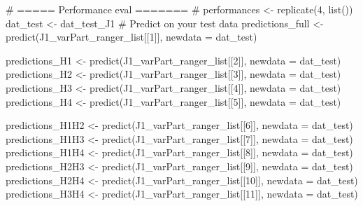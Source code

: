 \documentclass[
  letterpaper,
  DIV=11,
  numbers=noendperiod]{scrreprt}
\newenvironment{Shaded}{\begin{snugshade}}{\end{snugshade}}
\newcommand{\AttributeTok}[1]{\textcolor[rgb]{0.40,0.45,0.13}{#1}}
\newcommand{\CommentTok}[1]{\textcolor[rgb]{0.37,0.37,0.37}{#1}}
\newcommand{\DecValTok}[1]{\textcolor[rgb]{0.68,0.00,0.00}{#1}}
\newcommand{\FunctionTok}[1]{\textcolor[rgb]{0.28,0.35,0.67}{#1}}
\newcommand{\NormalTok}[1]{\textcolor[rgb]{0.00,0.23,0.31}{#1}}
\newcommand{\OtherTok}[1]{\textcolor[rgb]{0.00,0.23,0.31}{#1}}
\begin{document}
\begin{Shaded}
\begin{Highlighting}[]
\CommentTok{\# ===== Performance eval ======= \#}
\NormalTok{performances }\OtherTok{\textless{}{-}} \FunctionTok{replicate}\NormalTok{(}\DecValTok{4}\NormalTok{, }\FunctionTok{list}\NormalTok{())}
\NormalTok{dat\_test }\OtherTok{\textless{}{-}}\NormalTok{ dat\_test\_J1}
\CommentTok{\# Predict on your test data}
\NormalTok{predictions\_full }\OtherTok{\textless{}{-}} \FunctionTok{predict}\NormalTok{(J1\_varPart\_ranger\_list[[}\DecValTok{1}\NormalTok{]], }\AttributeTok{newdata =}\NormalTok{ dat\_test)}

\NormalTok{predictions\_H1 }\OtherTok{\textless{}{-}} \FunctionTok{predict}\NormalTok{(J1\_varPart\_ranger\_list[[}\DecValTok{2}\NormalTok{]], }\AttributeTok{newdata =}\NormalTok{ dat\_test)}
\NormalTok{predictions\_H2 }\OtherTok{\textless{}{-}} \FunctionTok{predict}\NormalTok{(J1\_varPart\_ranger\_list[[}\DecValTok{3}\NormalTok{]], }\AttributeTok{newdata =}\NormalTok{ dat\_test)}
\NormalTok{predictions\_H3 }\OtherTok{\textless{}{-}} \FunctionTok{predict}\NormalTok{(J1\_varPart\_ranger\_list[[}\DecValTok{4}\NormalTok{]], }\AttributeTok{newdata =}\NormalTok{ dat\_test)}
\NormalTok{predictions\_H4 }\OtherTok{\textless{}{-}} \FunctionTok{predict}\NormalTok{(J1\_varPart\_ranger\_list[[}\DecValTok{5}\NormalTok{]], }\AttributeTok{newdata =}\NormalTok{ dat\_test)}

\NormalTok{predictions\_H1H2 }\OtherTok{\textless{}{-}} \FunctionTok{predict}\NormalTok{(J1\_varPart\_ranger\_list[[}\DecValTok{6}\NormalTok{]], }\AttributeTok{newdata =}\NormalTok{ dat\_test)}
\NormalTok{predictions\_H1H3 }\OtherTok{\textless{}{-}} \FunctionTok{predict}\NormalTok{(J1\_varPart\_ranger\_list[[}\DecValTok{7}\NormalTok{]], }\AttributeTok{newdata =}\NormalTok{ dat\_test)}
\NormalTok{predictions\_H1H4 }\OtherTok{\textless{}{-}} \FunctionTok{predict}\NormalTok{(J1\_varPart\_ranger\_list[[}\DecValTok{8}\NormalTok{]], }\AttributeTok{newdata =}\NormalTok{ dat\_test)}
\NormalTok{predictions\_H2H3 }\OtherTok{\textless{}{-}} \FunctionTok{predict}\NormalTok{(J1\_varPart\_ranger\_list[[}\DecValTok{9}\NormalTok{]], }\AttributeTok{newdata =}\NormalTok{ dat\_test)}
\NormalTok{predictions\_H2H4 }\OtherTok{\textless{}{-}} \FunctionTok{predict}\NormalTok{(J1\_varPart\_ranger\_list[[}\DecValTok{10}\NormalTok{]], }\AttributeTok{newdata =}\NormalTok{ dat\_test)}
\NormalTok{predictions\_H3H4 }\OtherTok{\textless{}{-}} \FunctionTok{predict}\NormalTok{(J1\_varPart\_ranger\_list[[}\DecValTok{11}\NormalTok{]], }\AttributeTok{newdata =}\NormalTok{ dat\_test)}


\end{Highlighting}
\end{Shaded}
\end{document}
